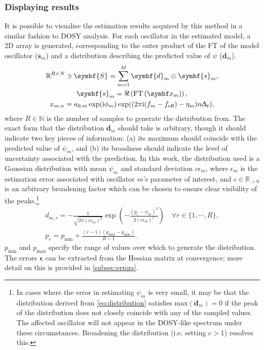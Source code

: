 \subsubsection{Displaying results}
It is possible to visualise the estimation results acquired by this method in a
similar fashion to \ac{DOSY} analysis. For each oscillator in the estimated
model, a \ac{2D} array is generated, corresponding to the outer product of the
\ac{FT} of the model oscillator ($\symbf{s}_m$) and a distribution describing
the predicted value of $\psi$ ($\symbf{d}_m$).
\begin{subequations}
    \begin{gather}
        \mathbb{R}^{R \times N} \ni \symbf{S} = \sum_{m=1}^{M}
        \symbf{d}_m \otimes
        \symbf{s}_m ,\label{eq:dosy-spectrum}\\
        \symbf{s}_m = \Re\left(\FT\left(\bx_m\right)\right),\\
        x_{m,n} = a_{0,m} \exp(\iu \phi_m)
        \exp((2 \pi \iu (f_m - \foff) - \eta_m ) n \Dt),
    \end{gather}%
    \label{eq:dosy-cross-product}%
\end{subequations}
where $R \in \mathbb{N}$ is the number of samples to generate the distribution from.
The exact form that the distribution $\symbf{d}_m$ should take is arbitrary,
though it should indicate two key pieces of information:
(a) its maximum should coincide with the predicted value of $\psi_m$, and (b) its
broadness should indicate the level of uncertainty associated with the
prediction. In this work, the
distribution used is a Gaussian distribution with mean $\psi_m$ and standard
deviation $c \epsilon_m$, where $\epsilon_m$ is the estimation error associated
with oscillator $m$'s parameter of interest, and $c \in \mathbb{R}_{>0}$ is an
arbitrary broadening factor which can be chosen to ensure clear visibility of
the peaks.\footnote{
    In cases where the error in estimating $\psi_m$ is very small, it may be
    that the distribution derived from \cref{eq:distribution} satisfies
    $\text{max}(\symbf{d}_m)=0$ if the peak of the distribution does
    not closely coincide with any of the sampled values. The affected
    oscillator will not appear in the \ac{DOSY}-like spectrum under these
    circumstances.
    Broadening the distribution (i.e. setting $c > 1$) resolves this.
}
\begin{subequations}
    \begin{gather}
        d_{m,r} = -\frac{1}{\sqrt{2 \pi (c \epsilon_m)^2}}
        \exp\left(
            - \frac{(p_r - \psi_m)^2}{2 (c \epsilon_m)^2}
        \right)\quad \forall r \in \lbrace 1, \cdots, R \rbrace,\\
        p_r = p_{\text{min}} + \frac{(r-1) (p_{\text{max}} - p_{\text{min}})}{R-1}.
    \end{gather}
    \label{eq:distribution}%
\end{subequations}
$p_{\text{min}}$ and $p_{\text{max}}$ specify the range of values over which to
generate the distribution.
The errors $\symbf{\epsilon}$ can be extracted from the Hessian matrix at
convergence; more detail on this is provided in \cref{subsec:errors}.

